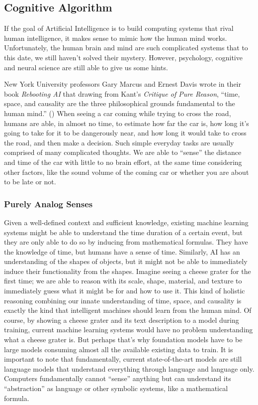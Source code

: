 \documentclass[12pt]{article}
\begin{document}
\subsection{Cognitive Algorithm}\label{cognition}
If the goal of Artificial Intelligence is to build computing systems that rival human intelligence, it makes sense to mimic how the human mind works. Unfortunately, the human brain and mind are such complicated systems that to this date, we still haven't solved their mystery. However, psychology, cognitive and neural science are still able to give us some hints.

New York University professors Gary Marcus and Ernest Davis wrote in their book \textit{Rebooting AI} that drawing from Kant's \textit{Critique of Pure Reason}, ``time, space, and causality are the three philosophical grounds fundamental to the human mind.'' (\cite{reboot}) When seeing a car coming while trying to cross the road, humans are able, in almost no time, to estimate how far the car is, how long it's going to take for it to be dangerously near, and how long it would take to cross the road, and then make a decision. Such simple everyday tasks are usually comprised of many complicated thoughts. We are able to ``sense'' the distance and time of the car with little to no brain effort, at the same time considering other factors, like the sound volume of the coming car or whether you are about to be late or not.

\subsubsection{Purely Analog Senses}
Given a well-defined context and sufficient knowledge, existing machine learning systems might be able to understand the time duration of a certain event, but they are only able to do so by inducing from mathematical formulas. They have the knowledge of time, but humans have a sense of time. Similarly, AI has an understanding of the shapes of objects, but it might not be able to immediately induce their functionality from the shapes. Imagine seeing a cheese grater for the first time; we are able to reason with its scale, shape, material, and texture to immediately guess what it might be for and how to use it. This kind of holistic reasoning combining our innate understanding of time, space, and causality is exactly the kind that intelligent machines should learn from the human mind. Of course, by showing a cheese grater and its text description to a model during training, current machine learning systems would have no problem understanding what a cheese grater is. But perhaps that's why foundation models have to be large models consuming almost all the available existing data to train. It is important to note that fundamentally, current state-of-the-art models are still language models that understand everything through language and language only. Computers fundamentally cannot ``sense'' anything but can understand its ``abstraction'' as language or other symbolic systems, like a mathematical formula.
\end{document}
